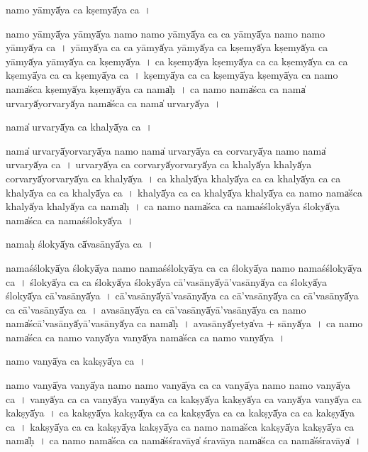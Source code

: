 \documentclass[parskip, DIV=14]{scrartcl}
\begin{document}
{namo॒ yāmyā̍ya ca॒ kṣemyā̍ya ca॒~।

namo॒ yāmyā̍ya॒ yāmyā̍ya॒ namo॒ namo॒ yāmyā̍ya ca ca॒ yāmyā̍ya॒ namo॒ namo॒ yāmyā̍ya ca~।
yāmyā̍ya ca ca॒ yāmyā̍ya॒ yāmyā̍ya ca॒ kṣemyā̍ya॒ kṣemyā̍ya ca॒ yāmyā̍ya॒ yāmyā̍ya ca॒ kṣemyā̍ya~।
ca॒ kṣemyā̍ya॒ kṣemyā̍ya ca ca॒ kṣemyā̍ya ca ca॒ kṣemyā̍ya ca ca॒ kṣemyā̍ya ca~।
kṣemyā̍ya ca ca॒ kṣemyā̍ya॒ kṣemyā̍ya ca॒ namo॒ nama̍śca॒ kṣemyā̍ya॒ kṣemyā̍ya ca॒ nama̍ḥ~।
ca॒ namo॒ nama̍śca ca॒ nama̍ urva॒ryā̍yorva॒ryā̍ya॒ nama̍śca ca॒ nama̍ urva॒ryā̍ya~।
                                                                                                                                                               
nama̍ urva॒ryā̍ya ca॒ khalyā̍ya ca॒~।

nama̍ urva॒ryā̍yorva॒ryā̍ya॒ namo॒ nama̍ urva॒ryā̍ya ca corva॒ryā̍ya namo॒ nama̍ urva॒ryā̍ya ca~।
u॒rva॒ryā̍ya ca corva॒ryā̍yorva॒ryā̍ya ca॒ khalyā̍ya॒ khalyā̍ya corva॒ryā̍yorva॒ryā̍ya ca॒ khalyā̍ya~।
ca॒ khalyā̍ya॒ khalyā̍ya ca ca॒ khalyā̍ya ca ca॒ khalyā̍ya ca ca॒ khalyā̍ya ca~।
khalyā̍ya ca ca॒ khalyā̍ya॒ khalyā̍ya ca॒ namo॒ nama̍śca॒ khalyā̍ya॒ khalyā̍ya ca॒ nama̍ḥ~।
ca॒ namo॒ nama̍śca ca॒ nama॒śślokyā̍ya॒ ślokyā̍ya॒ nama̍śca ca॒ nama॒śślokyā̍ya~।

nama॒ḥ ślokyā̍ya cā̍vasā॒nyā̍ya ca॒~।

nama॒śślokyā̍ya॒ ślokyā̍ya॒ namo॒ nama॒śślokyā̍ya ca ca॒ ślokyā̍ya॒ namo॒ nama॒śślokyā̍ya ca~। ślokyā̍ya ca ca॒ ślokyā̍ya॒ ślokyā̍ya cā'vasā॒nyā̍yā'vasā॒nyā̍ya ca॒ ślokyā̍ya॒ ślokyā̍ya cā'vasā॒nyā̍ya~।
cā॒'va॒sā॒nyā̍yā'vasā॒nyā̍ya ca  cā'vasā॒nyā̍ya ca cā'vasā॒nyā̍ya ca  cā'vasā॒nyā̍ya ca~।
a॒va॒sā॒nyā̍ya ca cā'vasā॒nyā̍yā'vasā॒nyā̍ya ca॒ namo॒ nama̍ścā'vasā॒nyā̍yā'vasā॒nyā̍ya ca॒ nama̍ḥ~।
a॒va॒sā॒nyā̍yetya̍va + sā॒nyā̍ya~।
ca॒ namo॒ nama̍śca ca॒ namo॒ vanyā̍ya॒ vanyā̍ya॒ nama̍śca ca॒ namo॒ vanyā̍ya~।

namo॒ vanyā̍ya ca॒ kakṣyā̍ya ca॒~।

namo॒ vanyā̍ya॒ vanyā̍ya॒  namo॒ namo॒ vanyā̍ya ca ca॒ vanyā̍ya॒  namo॒ namo॒ vanyā̍ya ca~।
vanyā̍ya ca ca॒ vanyā̍ya॒ vanyā̍ya ca॒ kakṣyā̍ya॒ kakṣyā̍ya ca॒ vanyā̍ya॒ vanyā̍ya ca॒ kakṣyā̍ya~।
ca॒ kakṣyā̍ya॒ kakṣyā̍ya ca ca॒ kakṣyā̍ya ca ca॒ kakṣyā̍ya ca ca॒ kakṣyā̍ya ca~।
kakṣyā̍ya ca ca॒ kakṣyā̍ya॒ kakṣyā̍ya ca॒ namo॒ nama̍śca॒ kakṣyā̍ya॒ kakṣyā̍ya ca॒ nama̍ḥ~।
ca॒ namo॒ nama̍śca ca॒ nama̍śśra॒vāya̍ śra॒vāya॒ nama̍śca ca॒ nama̍śśra॒vāya̍~।

}
\end{document}
